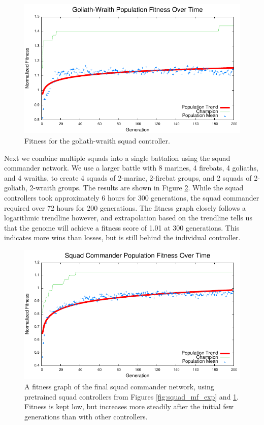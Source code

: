\documentclass[10pt,a4paper,twocolumn]{article}
\begin{document}
\begin{figure}
\centering
\includegraphics[scale=.59]{plots/squad_gw.pdf}
\caption{Fitness for the goliath-wraith squad controller.}
\label{fig:squad_gw_exp}
\end{figure}

Next we combine multiple squads into a single battalion using the squad commander network. We use a larger battle with 8 marines, 4 firebats, 4 goliaths, and 4 wraiths, to create 4 squads of 2-marine, 2-firebat groups, and 2 squads of 2-goliath, 2-wraith groups. The results are shown in Figure \ref{fig:squadcommand_exp}. While the squad controllers took approximately 6 hours for 300 generations, the squad commander required over 72 hours for 200 generations. The fitness graph closely follows a logarithmic trendline however, and extrapolation based on the trendline tells us that the genome will achieve a fitness score of 1.01 at 300 generations. This indicates more wins than losses, but is still behind the individual controller.

\begin{figure}
\centering
\includegraphics[scale=.59]{plots/squadcommand.pdf}
\caption{A fitness graph of the final squad commander network, using pretrained squad controllers from Figures \ref{fig:squad_mf_exp} and \ref{fig:squad_gw_exp}. Fitness is kept low, but increases more steadily after the initial few generations than with other controllers.}
\label{fig:squadcommand_exp}
\end{figure}
\end{document}
